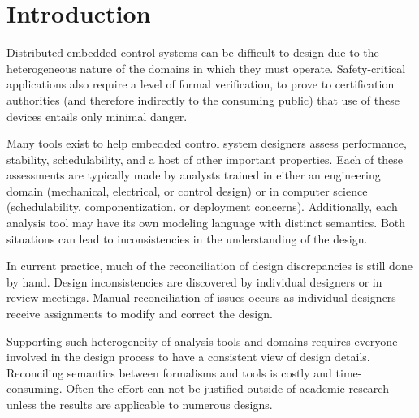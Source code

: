 \section{Introduction}

Distributed embedded control systems can be difficult to design due to the heterogeneous 
nature of the domains in which they must operate.  Safety-critical applications also 
require a level of formal verification, to prove to certification authorities (and 
therefore indirectly to the consuming public) that use of these devices entails only 
minimal danger.  


Many tools exist to help embedded control system designers assess performance, stability, 
schedulability, and a host of other important properties.  Each of these assessments are 
typically made by analysts trained in either an engineering domain (mechanical, electrical, 
or control design) or in computer science (schedulability, componentization, or deployment 
concerns).  Additionally, each analysis tool may have its own modeling language with distinct 
semantics.  Both situations can lead to inconsistencies in the understanding of the design.

In current practice, much of the reconciliation of design discrepancies is still done by 
hand.  Design inconsistencies are discovered by individual designers or in review meetings.  
Manual reconciliation of issues occurs as individual designers receive assignments to modify 
and correct the design.


Supporting such heterogeneity of analysis tools and domains requires everyone involved in 
the design process to have a consistent view of design details.  Reconciling semantics 
between formalisms and tools is costly and time-consuming.  Often the effort can not be 
justified outside of academic research unless the results are applicable to numerous designs.


